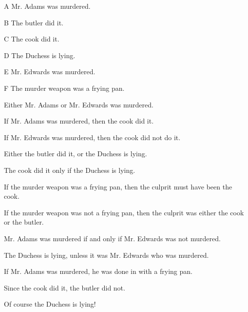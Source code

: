 \problempart 
\begin{ekey}
\item[A] Mr. Adams was murdered.
\item[B] The butler did it.
\item[C] The cook did it.
\item[D] The Duchess is lying.
\item[E] Mr. Edwards was murdered.
\item[F] The murder weapon was a frying pan.
\end{ekey}
\begin{earg}
\item Either Mr. Adams or Mr. Edwards was murdered.
\item[] 
\item If Mr. Adams was murdered, then the cook did it.
\item[] 
\item If Mr. Edwards was murdered, then the cook did not do it.
\item[] 
\item Either the butler did it, or the Duchess is lying.
\item[] 
\item The cook did it only if the Duchess is lying.
\item[] 
\item If the murder weapon was a frying pan, then the culprit must have been the cook.
\item[] 
\item If the murder weapon was not a frying pan, then the culprit was either the cook or the butler.
\item[] 
\item Mr. Adams was murdered if and only if Mr. Edwards was not murdered.
\item[] 
\item The Duchess is lying, unless it was Mr. Edwards who was murdered.
\item[] 
\item If Mr. Adams was murdered, he was done in with a frying pan.
\item[] 
\item Since the cook did it, the butler did not.
\item[] 
\item Of course the Duchess is lying!
\item[] 
\end{earg}


